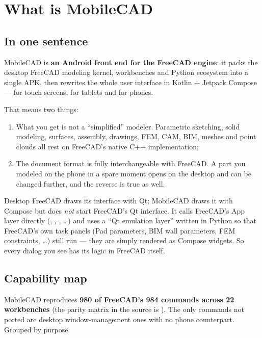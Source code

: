 \chapter{What is MobileCAD}

\section{In one sentence}

MobileCAD is \textbf{an Android front end for the FreeCAD engine}: it packs the desktop FreeCAD modeling
kernel, workbenches and Python ecosystem into a single APK, then rewrites the whole user interface in
Kotlin + Jetpack Compose — for touch screens, for tablets and for phones.

That means two things:

\begin{enumerate}
  \item What you get is not a “simplified” modeler. Parametric sketching, solid modeling, surfaces,
        assembly, drawings, FEM, CAM, BIM, meshes and point clouds all rest on FreeCAD's native C++
        implementation;
  \item The document format is fully interchangeable with FreeCAD. A part you modeled on the phone in a
        spare moment opens on the desktop and can be changed further, and the reverse is true as well.
\end{enumerate}

\begin{tip}
Desktop FreeCAD draws its interface with Qt; MobileCAD draws it with Compose but does \emph{not} start
FreeCAD's Qt interface. It calls FreeCAD's App layer directly (, ,
, …) and uses a “Qt emulation layer” written in Python so that FreeCAD's own task panels
(Pad parameters, BIM wall parameters, FEM constraints, …) still run — they are simply rendered as Compose
widgets. So every dialog you see has its logic in FreeCAD itself.
\end{tip}

\section{Capability map}

MobileCAD reproduces \textbf{980 of FreeCAD's 984 commands across 22 workbenches} (the parity matrix in the
source is ). The only commands not ported are desktop window-management ones with no
phone counterpart. Grouped by purpose:

